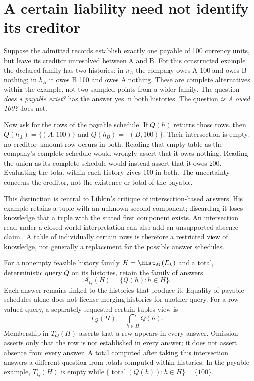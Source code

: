\section{A certain liability need not identify its creditor}
\label{sec:query-certainty}

Suppose the admitted records establish exactly one payable of 100 currency
units, but leave its creditor unresolved between A and B. For this constructed
example the declared family has two histories: in $h_A$ the company owes A
100 and owes B nothing; in $h_B$ it owes B 100 and owes A nothing. These are
complete alternatives within the example, not two sampled points from a wider
family. The question \emph{does a payable exist?} has the answer yes in both
histories. The question \emph{is A owed 100?} does not.

Now ask for the rows of the payable schedule. If $Q(h)$ returns those rows,
then $Q(h_A)=\{(A,100)\}$ and $Q(h_B)=\{(B,100)\}$. Their intersection is
empty: no creditor--amount row occurs in both. Reading that empty table as
the company's complete schedule would wrongly assert that it owes nothing.
Reading the union as its complete schedule would instead assert that it owes
200. Evaluating the total within each history gives 100 in both. The
uncertainty concerns the creditor, not the existence or total of the payable.

This distinction is central to Libkin's critique of intersection-based
answers. His example retains a tuple with an unknown second component;
discarding it loses knowledge that a tuple with the stated first component
exists. An intersection read under a closed-world interpretation can also
add an unsupported absence claim \citep[Section~3 and the opening of
Section~6]{libkin2014}. A table of individually certain rows is therefore a
restricted view of knowledge, not generally a replacement for the possible
answer schedules.

For a nonempty feasible history family $H=\Hist_M(D_k)$ and a total,
deterministic query $Q$ on its histories, retain the family of answers
\[
 \mathcal{A}_Q(H)=\{Q(h):h\in H\}.
\]
Each answer remains linked to the histories that produce it. Equality of
payable schedules alone does not license merging histories for another query.
For a row-valued query, a separately requested certain-tuples view is
\[
 T_Q(H)=\bigcap_{h\in H}Q(h).
\]
Membership in $T_Q(H)$ asserts that a row appears in every answer. Omission
asserts only that the row is not established in every answer; it does not
assert absence from every answer. A total computed after taking this
intersection answers a different question from totals computed within
histories. In the payable example, $T_Q(H)$ is empty while
$\{\operatorname{total}(Q(h)):h\in H\}=\{100\}$.

